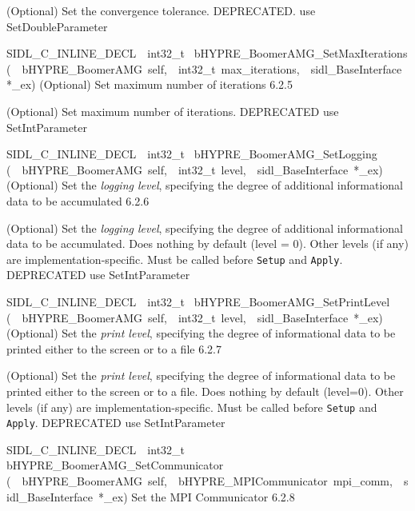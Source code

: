 \documentclass{article}
\begin{document}
\begin{cxxentry}
\begin{cxxentry}
\begin{cxxfunction}
\begin{cxxdoc}
(Optional) Set the convergence tolerance.
DEPRECATED.  use SetDoubleParameter
\end{cxxdoc}
\end{cxxfunction}
\begin{cxxfunction}
{SIDL\_C\_INLINE\_DECL\ \ int32\_t\ }
        {bHYPRE\_BoomerAMG\_SetMaxIterations}
        {(\ \ bHYPRE\_BoomerAMG\ self,\ \ int32\_t\ max\_iterations,\ \ sidl\_BaseInterface\ *\_ex)}
        {
(Optional) Set maximum number of iterations}
        {6.2.5}
\begin{cxxdoc}

(Optional) Set maximum number of iterations.
DEPRECATED   use SetIntParameter
\end{cxxdoc}
\end{cxxfunction}
\begin{cxxfunction}
{SIDL\_C\_INLINE\_DECL\ \ int32\_t\ }
        {bHYPRE\_BoomerAMG\_SetLogging}
        {(\ \ bHYPRE\_BoomerAMG\ self,\ \ int32\_t\ level,\ \ sidl\_BaseInterface\ *\_ex)}
        {
(Optional) Set the {\it logging level}, specifying the degree
of additional informational data to be accumulated}
        {6.2.6}
\begin{cxxdoc}

(Optional) Set the {\it logging level}, specifying the degree
of additional informational data to be accumulated.  Does
nothing by default (level = 0).  Other levels (if any) are
implementation-specific.  Must be called before {\tt Setup}
and {\tt Apply}.
DEPRECATED   use SetIntParameter
\end{cxxdoc}
\end{cxxfunction}
\begin{cxxfunction}
{SIDL\_C\_INLINE\_DECL\ \ int32\_t\ }
        {bHYPRE\_BoomerAMG\_SetPrintLevel}
        {(\ \ bHYPRE\_BoomerAMG\ self,\ \ int32\_t\ level,\ \ sidl\_BaseInterface\ *\_ex)}
        {
(Optional) Set the {\it print level}, specifying the degree
of informational data to be printed either to the screen or
to a file}
        {6.2.7}
\begin{cxxdoc}

(Optional) Set the {\it print level}, specifying the degree
of informational data to be printed either to the screen or
to a file.  Does nothing by default (level=0).  Other levels
(if any) are implementation-specific.  Must be called before
{\tt Setup} and {\tt Apply}.
DEPRECATED   use SetIntParameter
\end{cxxdoc}
\end{cxxfunction}
\begin{cxxfunction}
{SIDL\_C\_INLINE\_DECL\ \ int32\_t\ }
        {bHYPRE\_BoomerAMG\_SetCommunicator}
        {(\ \ bHYPRE\_BoomerAMG\ self,\ \ bHYPRE\_MPICommunicator\ mpi\_comm,\ \ sidl\_BaseInterface\ *\_ex)}
        {
Set the MPI Communicator}
        {6.2.8}
\begin{cxxdoc}


\end{cxxdoc}
\end{cxxfunction}
\end{cxxentry}
\end{cxxentry}
\end{document}
